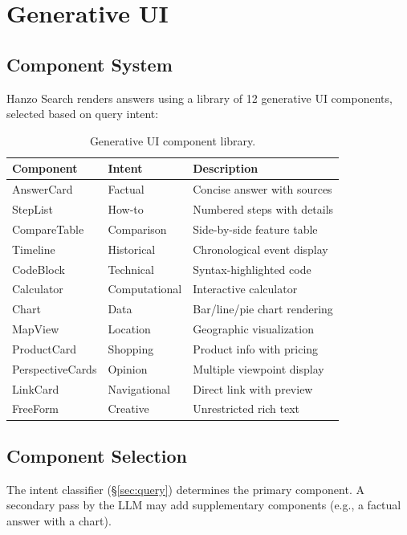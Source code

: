 \section{Generative UI}

\label{sec:genui}

\subsection{Component System}

Hanzo Search renders answers using a library of 12 generative UI components, selected based on query intent:

\begin{table}[H]
\centering
\small
\begin{tabular}{lll}
\toprule
\textbf{Component} & \textbf{Intent} & \textbf{Description} \\
\midrule
AnswerCard & Factual & Concise answer with sources \\
StepList & How-to & Numbered steps with details \\
CompareTable & Comparison & Side-by-side feature table \\
Timeline & Historical & Chronological event display \\
CodeBlock & Technical & Syntax-highlighted code \\
Calculator & Computational & Interactive calculator \\
Chart & Data & Bar/line/pie chart rendering \\
MapView & Location & Geographic visualization \\
ProductCard & Shopping & Product info with pricing \\
PerspectiveCards & Opinion & Multiple viewpoint display \\
LinkCard & Navigational & Direct link with preview \\
FreeForm & Creative & Unrestricted rich text \\
\bottomrule
\end{tabular}
\caption{Generative UI component library.}
\label{tab:components}
\end{table}

\subsection{Component Selection}

The intent classifier (\S\ref{sec:query}) determines the primary component. A secondary pass by the LLM may add supplementary components (e.g., a factual answer with a chart).

